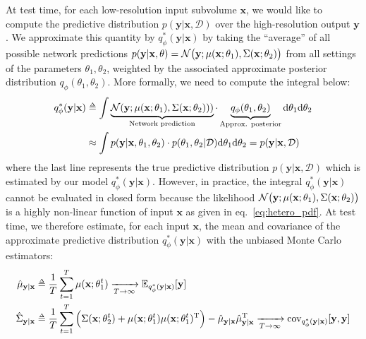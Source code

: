  At test time, for each low-resolution input subvolume $\mathbf{x}$, we would like to compute the predictive distribution $p(\mathbf{y}|\mathbf{x}, \mathcal{D})$ over the high-resolution output $\mathbf{y}$. We approximate this quantity by $q_\phi^*(\mathbf{y}|\mathbf{x})$ by taking the ``average'' of all possible network predictions $p(\mathbf{y}|\mathbf{x}, \theta)=\mathcal{N}\big{(}\mathbf{y}; \mu(\mathbf{x};\theta_1),\Sigma(\mathbf{x};\theta_2)\big{)} $ from all settings of the parameters $\theta_1, \theta_2$, weighted by the associated approximate posterior distribution $q_{\phi}(\theta_1, \theta_2)$. More formally, we need to compute the integral below:
\begin{align} 
q_\phi^*(\mathbf{y}|\mathbf{x}) &\delequal  \int \underbrace{\mathcal{N}(\mathbf{y}; \mu(\mathbf{x};\theta_1),\Sigma(\mathbf{x};\theta_2))) }_{\text{Network prediction}}\cdot \underbrace{q_{\phi}(\theta_1, \theta_2)}_{\text{Approx. posterior}}  \mathrm{d}\theta_1  \mathrm{d}\theta_2  \label{eq:full_distribution} \\
& \approx \int p(\mathbf{y}|\mathbf{x}, \theta_1, \theta_2)\cdot p(\theta_1, \theta_2|\mathcal{D})  \mathrm{d}\theta_1 \mathrm{d}\theta_2 = p(\mathbf{y}|\mathbf{x}, \mathcal{D})  
\end{align}
where the last line represents the true predictive distribution $p(\mathbf{y}|\mathbf{x}, \mathcal{D})$ which is estimated by our model $q_\phi^*(\mathbf{y}|\mathbf{x})$. However, in practice, the integral $q_\phi^*(\mathbf{y}|\mathbf{x})$ cannot be evaluated in closed form because the likelihood $\mathcal{N}\big{(}\mathbf{y}; \mu(\mathbf{x};\theta_1),\Sigma(\mathbf{x};\theta_2)\big{)}$ is a highly non-linear function of input $\mathbf{x}$ as given in eq.~\ref{eq:hetero_pdf}. At test time, we therefore estimate, for each input $\mathbf{x}$, the mean and covariance of the approximate predictive distribution $q_\phi^*(\mathbf{y}|\mathbf{x})$ with the unbiased Monte Carlo estimators: 
\vspace{-3mm}
\begin{align}
\hat{\mu}_{\mathbf{y}|\mathbf{x}}&\delequal \frac{1}{T}\sum_{t=1}^T\mu(\mathbf{x};\theta_{1}^{t}) \label{eq:est_mean} \xrightarrow[T\rightarrow\infty]{}\mathbb{E}_{q_\phi^*(\mathbf{y}|\mathbf{x})} [\mathbf{y}]\\
\hat{\Sigma}_{\mathbf{y}|\mathbf{x}} &\delequal \frac{1}{T} \sum_{t=1}^T\Big{(}\Sigma(\mathbf{x};\theta_{2}^{t})+\mu(\mathbf{x};\theta_1^t)\mu(\mathbf{x};\theta_1^t)^{\text{T}}\Big{)}-\hat{\mu}_{\mathbf{y}|\mathbf{x}} \hat{\mu}_{\mathbf{y}|\mathbf{x}}^{\text{T}}\xrightarrow[T\rightarrow\infty]{}\text{cov}_{q_\phi^*(\mathbf{y}|\mathbf{x})} [\mathbf{y}, \mathbf{y}]
\label{eq:est_cov}
\end{align}
